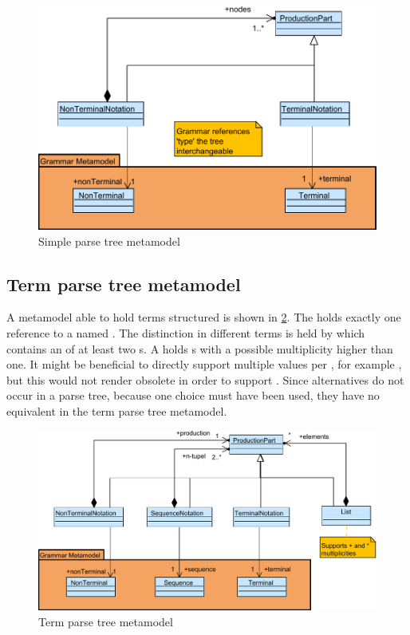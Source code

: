 \begin{figure}
\centering
\includegraphics[scale=0.75]{gfx/ex/Notation_ParseTree} 
\caption{Simple parse tree metamodel}
\label{MM:Not:PT}
\end{figure}

\subsection{Term parse tree metamodel}A metamodel able to hold terms structured is shown in \ref{MM:Not:TT}. The  holds exactly one reference to a  named . The distinction in different terms is held by  which contains an  of at least two s. A  holds s with a possible multiplicity higher than one. It might be beneficial to directly support multiple values per , for example , but this would not render  obsolete in order to support . Since alternatives do not occur in a parse tree, because one choice must have been used, they have no equivalent in the term parse tree metamodel. 

\begin{figure}
\centering
\includegraphics[scale=0.75]{gfx/ex/Notation_TermTree} 
\caption{Term parse tree metamodel}
\label{MM:Not:TT}
\end{figure}

